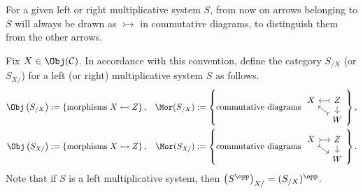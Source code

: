 \begin{convention}
	For a given left or right multiplicative system $S$, from now on arrows
	belonging to $S$ will always be drawn as $\rightarrowtail$ in commutative
	diagrams, to distinguish them from the other arrows.
\end{convention}

Fix $X\in\Obj(\mathcal{C})$. In accordance with this convention, define the
category $S_{/X}$ (or $S_{X/}$) for a left (or right) multiplicative system
$S$ as follows.
\begin{align*}
	\Obj\left(S_{/X}\right) &:= \left\{\text{morphisms}\;X\leftarrowtail Z\right\}, & \Mor(S_{/X}) &:= \left\{\text{commutative diagrams}\;
	{\begin{tikzcd}[row sep=small, column sep=small, ampersand replacement=\&]
			X \& Z \arrow[rightarrowtail, l] \arrow[d] \\
			\& W \arrow[rightarrowtail, lu]
	\end{tikzcd}}\right\}, \\
	\Obj\left(S_{X/}\right) &:= \left\{\text{morphisms}\;X\rightarrowtail Z\right\}, & \Mor(S_{X/}) &:= \left\{\text{commutative diagrams}\;
	{\begin{tikzcd}[row sep=small, column sep=small, ampersand replacement=\&]
			X \arrow[rightarrowtail, r] \arrow[rightarrowtail, rd] \& Z \arrow[d] \\
			\& W
	\end{tikzcd}}\right\}.
\end{align*}
Note that if $S$ is a left multiplicative system, then
$\left(S^{\opp}\right)_{X/}=(S_{/X})^{\opp}$.

